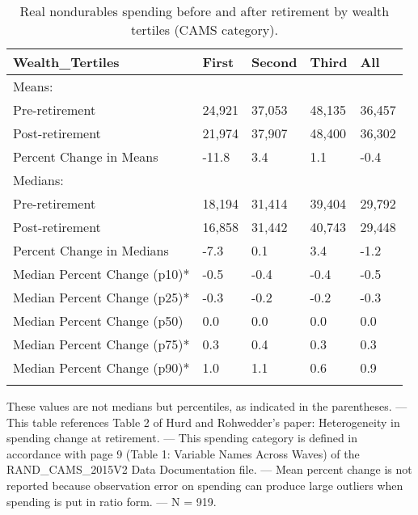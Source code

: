 \begin{table}[tbp] \centering
{}

\caption{Real nondurables spending before and after retirement by wealth tertiles (CAMS category).}
\begin{tabularx}{\textwidth}{lCCCC}

\toprule
{Wealth\_Tertiles}&{First}&{Second}&{Third}&{All} \tabularnewline
\midrule\addlinespace[1.5ex]
Means:&&&& \tabularnewline
\midrule Pre-retirement&24,921&37,053&48,135&36,457 \tabularnewline
Post-retirement&21,974&37,907&48,400&36,302 \tabularnewline
Percent Change in Means&-11.8&3.4&1.1&-0.4 \tabularnewline
\midrule Medians:&&&& \tabularnewline
\midrule Pre-retirement&18,194&31,414&39,404&29,792 \tabularnewline
Post-retirement&16,858&31,442&40,743&29,448 \tabularnewline
Percent Change in Medians&-7.3&0.1&3.4&-1.2 \tabularnewline
Median Percent Change (p10)*&-0.5&-0.4&-0.4&-0.5 \tabularnewline
Median Percent Change (p25)*&-0.3&-0.2&-0.2&-0.3 \tabularnewline
Median Percent Change (p50)&0.0&0.0&0.0&0.0 \tabularnewline
Median Percent Change (p75)*&0.3&0.4&0.3&0.3 \tabularnewline
Median Percent Change (p90)*&1.0&1.1&0.6&0.9 \tabularnewline
\bottomrule \addlinespace[1.5ex]

\end{tabularx}
\begin{flushleft}
\footnotesize *These values are not medians but percentiles, as indicated in the parentheses. \linebreak --- \linebreak This table references Table 2 of Hurd and Rohwedder's paper: Heterogeneity in spending change at retirement. \linebreak --- \linebreak This spending category is defined in accordance with page 9 (Table 1: Variable Names Across Waves) of the RAND\_CAMS\_2015V2 Data Documentation file. \linebreak --- \linebreak Mean percent change is not reported because observation error on spending can produce large outliers when spending is put in ratio form. \linebreak --- \linebreak N = 919.
\end{flushleft}
\end{table}
